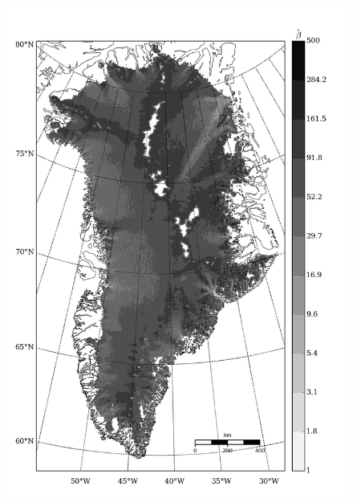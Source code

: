 \begin{figure}
  \centering
  \begin{minipage}[b]{0.47\linewidth}
    \includegraphics[width=1.0\textwidth]{images/greenland/stats/GLM_beta_no_membrane_stress.jpg}
  \end{minipage}
  \quad
  \begin{minipage}[b]{0.47\linewidth}

\end{minipage}
\end{figure}
